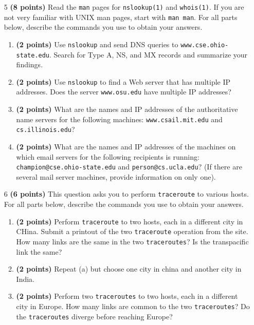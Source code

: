 \documentclass{article}
\begin{document}
\begin{enumerate}
\item[5]\textbf{(8 points)} Read the \texttt{man} pages for \texttt{nslookup(1)} and \texttt{whois(1)}. If you are not very familiar with UNIX man pages, start with \texttt{man man}. For all parts below, describe the commands you use to obtain your answers.

  \begin{enumerate}
  \item \textbf{(2 points)} Use \texttt{nslookup} and send DNS queries to \texttt{www.cse.ohio-state.edu}. Search for Type A, NS, and MX records and summarize your findings.
  \item \textbf{(2 points)} Use \texttt{nslookup} to find a Web server that has multiple IP addresses. Does the server \texttt{www.osu.edu} have multiple IP addresses?
  \item \textbf{(2 points)} What are the names and IP addresses of the authoritative name servers for the following machines: \texttt{www.csail.mit.edu} and \texttt{cs.illinois.edu}?
  \item \textbf{(2 points)} What are the names and IP addresses of the machines on which email servers for the following recipients is running: \texttt{champion@cse.ohio-state.edu} and \texttt{person@cs.ucla.edu}? (If there are several mail server machines, provide information on only one).
  \end{enumerate}

\item[6]\textbf{(6 points)} This question asks you to perform \texttt{traceroute} to various hosts. For all parts below, describe the commands you use to obtain your answers.

  \begin{enumerate}
  \item \textbf{(2 points)} Perform \texttt{traceroute} to two hosts, each in a different city in CHina. Submit a printout of the two \texttt{traceroute} operation from the site. How many links are the same in the two \texttt{traceroutes}? Is the transpacific link the same?
  \item \textbf{(2 points)} Repeat (a) but choose one city in china and another city in India.
  \item \textbf{(2 points)} Perform two \texttt{traceroutes} to two hosts, each in a different city in Europe. How many links are common to the two \texttt{traceroutes}? Do the \texttt{traceroutes} diverge before reaching Europe?
  \end{enumerate}
\end{enumerate}
\end{document}
